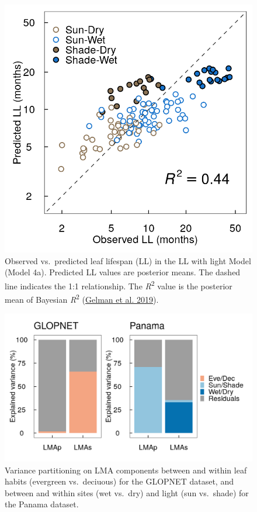\documentclass[
  12pt,
  a4paper,
,tablecaptionabove
]{scrartcl}
\begin{document}
\begin{figure}

{\centering \includegraphics{../figs/pa_point_ll.png}

}

\caption{\label{fig-LLplt}Observed vs.~predicted leaf lifespan (LL) in
the LL with light Model (Model 4a). Predicted LL values are posterior
means. The dashed line indicates the 1:1 relationship. The
\emph{R}\textsuperscript{2} value is the posterior mean of Bayesian
\emph{R}\textsuperscript{2} (\protect\hyperlink{ref-Gelman2019}{Gelman
et al. 2019}).}

\end{figure}

\newpage

\begin{figure}

{\centering \includegraphics{../figs/vpart.png}

}

\caption{\label{fig-vpart}Variance partitioning on LMA components
between and within leaf habits (evergreen vs.~deciuous) for the GLOPNET
dataset, and between and within sites (wet vs.~dry) and light (sun
vs.~shade) for the Panama dataset.}

\end{figure}
\end{document}

